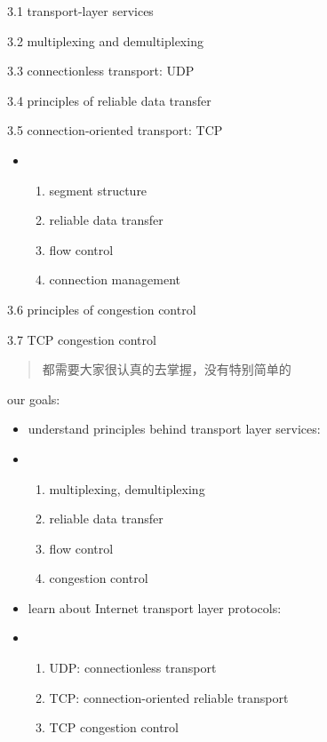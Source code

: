 \documentclass[
]{article}
\begin{document}
3.1 transport-layer services

3.2 multiplexing and demultiplexing

3.3 connectionless transport: UDP

3.4 principles of reliable data transfer

3.5 connection-oriented transport: TCP

\begin{itemize}
\item
  \begin{enumerate}
  \def\labelenumi{\arabic{enumi}.}
  \item
    segment structure
  \item
    reliable data transfer
  \item
    flow control
  \item
    connection management
  \end{enumerate}
\end{itemize}

3.6 principles of congestion control

3.7 TCP congestion control

\begin{quote}
都需要大家很认真的去掌握，没有特别简单的
\end{quote}

our goals:

\begin{itemize}
\item
  understand principles behind transport layer services:
\item
  \begin{enumerate}
  \def\labelenumi{\arabic{enumi}.}
  \item
    multiplexing, demultiplexing
  \item
    reliable data transfer
  \item
    flow control
  \item
    congestion control
  \end{enumerate}
\item
  learn about Internet transport layer protocols:
\item
  \begin{enumerate}
  \def\labelenumi{\arabic{enumi}.}
  \item
    UDP: connectionless transport
  \item
    TCP: connection-oriented reliable transport
  \item
    TCP congestion control
  \end{enumerate}
\end{itemize}
\end{document}
